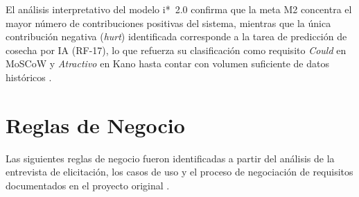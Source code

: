 \documentclass[12pt,a4paper]{article}
\begin{document}
El análisis interpretativo del modelo i*~2.0 confirma que la meta M2 concentra
el mayor número de contribuciones positivas del sistema, mientras que la única
contribución negativa (\textit{hurt}) identificada corresponde a la tarea de
predicción de cosecha por IA (RF-17), lo que refuerza su clasificación como
requisito \textit{Could} en MoSCoW y \textit{Atractivo} en Kano hasta contar
con volumen suficiente de datos históricos \cite{Pohl2010,Yu1995}.


\section{Reglas de Negocio}

Las siguientes reglas de negocio fueron identificadas a partir del análisis de
la entrevista de elicitación, los casos de uso y el proceso de negociación de
requisitos documentados en el proyecto original \cite{Pohl2010,ISO29148:2018}.
\end{document}
